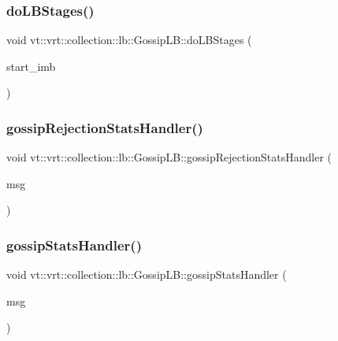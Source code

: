 \subsubsection{\texorpdfstring{do\+L\+B\+Stages()}{doLBStages()}}
{\footnotesize\ttfamily void vt\+::vrt\+::collection\+::lb\+::\+Gossip\+L\+B\+::do\+L\+B\+Stages (\begin{DoxyParamCaption}\item[{\hyperlink{namespacevt_a876a9d0cd5a952859c72de8a46881442}{Time\+Type}}]{start\+\_\+imb }\end{DoxyParamCaption})\hspace{0.3cm}{\ttfamily [protected]}}

\mbox{\label{structvt_1_1vrt_1_1collection_1_1lb_1_1_gossip_l_b_ab4300cdb3ea4c7be65d127f2282a63ca}} 
\subsubsection{\texorpdfstring{gossip\+Rejection\+Stats\+Handler()}{gossipRejectionStatsHandler()}}
{\footnotesize\ttfamily void vt\+::vrt\+::collection\+::lb\+::\+Gossip\+L\+B\+::gossip\+Rejection\+Stats\+Handler (\begin{DoxyParamCaption}\item[{\hyperlink{structvt_1_1vrt_1_1collection_1_1lb_1_1_gossip_l_b_aca0c34945e33ca19b88af98ca8a6f062}{Gossip\+Rejection\+Msg\+Type} $\ast$}]{msg }\end{DoxyParamCaption})\hspace{0.3cm}{\ttfamily [protected]}}

\mbox{\label{structvt_1_1vrt_1_1collection_1_1lb_1_1_gossip_l_b_a6cf29ed3fcc2d7db4c02cf0517cf8e49}} 
\subsubsection{\texorpdfstring{gossip\+Stats\+Handler()}{gossipStatsHandler()}}
{\footnotesize\ttfamily void vt\+::vrt\+::collection\+::lb\+::\+Gossip\+L\+B\+::gossip\+Stats\+Handler (\begin{DoxyParamCaption}\item[{\hyperlink{structvt_1_1vrt_1_1collection_1_1lb_1_1_base_l_b_a0cddaecd9e8450190585d0607a3439f1}{Stats\+Msg\+Type} $\ast$}]{msg }\end{DoxyParamCaption})\hspace{0.3cm}{\ttfamily [protected]}}

